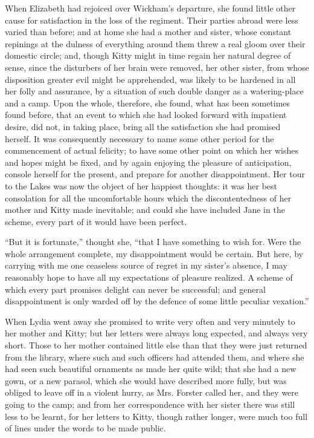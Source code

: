 \documentclass[10pt]{book}
\begin{document}
   When Elizabeth had rejoiced over Wickham’s departure, she found little
other cause for satisfaction in the loss of the regiment. Their parties
abroad were less varied than before; and at home she had a mother and
   sister, whose constant repinings at the dulness of everything around
them threw a real gloom over their domestic circle; and, though Kitty
might in time regain her natural degree of sense, since the disturbers
of her brain were removed, her other sister, from whose disposition
greater evil might be apprehended, was likely to be hardened in all her
folly and assurance, by a situation of such double danger as a
watering-place and a camp. Upon the whole, therefore, she found, what
has been sometimes found before, that an event to which she had looked
forward with impatient desire, did not, in taking place, bring all the
satisfaction she had promised herself. It was consequently necessary to
name some other period for the commencement of actual felicity; to have
some other point on which her wishes and hopes might be fixed, and by
again enjoying the pleasure of anticipation, console herself for the
present, and prepare for another disappointment. Her tour to the Lakes
was now the object of her happiest thoughts: it was her best consolation
for all the uncomfortable hours which the discontentedness of her mother
and Kitty made inevitable; and could she have included Jane in the
scheme, every part of it would have been perfect.
  

   “But it is fortunate,” thought she, “that I have something to wish for.
Were the whole arrangement complete, my disappointment would be certain.
But here, by carrying with me one ceaseless source of regret in my
sister’s absence, I may reasonably hope to have all my expectations of
pleasure realized. A scheme of which every part promises delight can
never be successful; and general disappointment is only warded off by
the defence of some little peculiar vexation.”
  

   When Lydia went away she promised to write very
   often and very minutely
to her mother and Kitty; but her letters were always long expected, and
always very short. Those to her mother contained little else than that
they were just returned from the library, where such and such officers
had attended them, and where she had seen such beautiful ornaments as
made her quite wild; that she had a new gown, or a new parasol, which
she would have described more fully, but was obliged to leave off in a
violent hurry, as Mrs. Forster called her, and they were going to the
camp; and from her correspondence with her sister there was still less
to be learnt, for her letters to Kitty, though rather longer, were much
too full of lines under the words to be made public.
  
\end{document}

